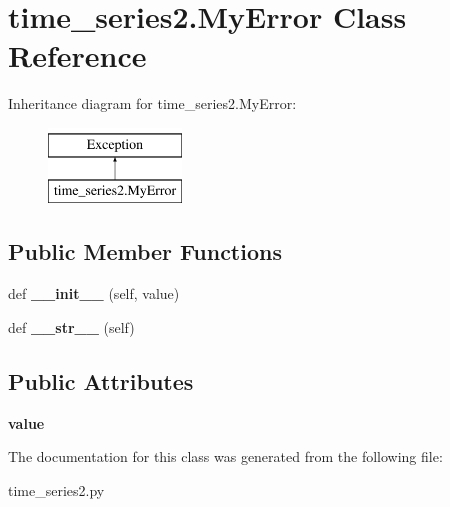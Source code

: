 \hypertarget{classtime__series2_1_1MyError}{}\section{time\+\_\+series2.\+My\+Error Class Reference}
\label{classtime__series2_1_1MyError}
Inheritance diagram for time\+\_\+series2.\+My\+Error\+:\begin{figure}[H]
\begin{center}
\leavevmode
\includegraphics[height=2.000000cm]{classtime__series2_1_1MyError}
\end{center}
\end{figure}
\subsection*{Public Member Functions}
\begin{DoxyCompactItemize}
\item 
\mbox{\label{classtime__series2_1_1MyError_a95049e5f40616db22f53ae0563711fd8}} 
def {\bfseries \+\_\+\+\_\+init\+\_\+\+\_\+} (self, value)
\item 
\mbox{\label{classtime__series2_1_1MyError_ae3cd3b588fdeb03d9097f90b0a155d00}} 
def {\bfseries \+\_\+\+\_\+str\+\_\+\+\_\+} (self)
\end{DoxyCompactItemize}
\subsection*{Public Attributes}
\begin{DoxyCompactItemize}
\item 
\mbox{\label{classtime__series2_1_1MyError_aae247f8730b0a60117813a232e7b6e7c}} 
{\bfseries value}
\end{DoxyCompactItemize}


The documentation for this class was generated from the following file\+:\begin{DoxyCompactItemize}
\item 
time\+\_\+series2.\+py\end{DoxyCompactItemize}
